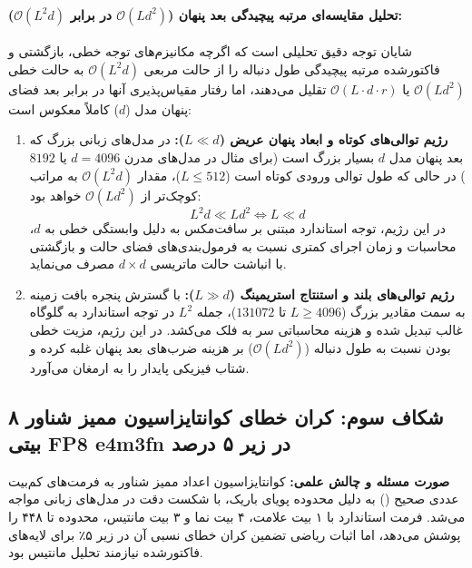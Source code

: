 \documentclass[12pt,a4paper]{report}
\theoremstyle{definition}
\begin{document}
\paragraph{تحلیل مقایسه‌ای مرتبه پیچیدگی بعد پنهان ($\mathcal{O}(L d^2)$ در برابر $\mathcal{O}(L^2 d)$):}
شایان توجه دقیق تحلیلی است که اگرچه مکانیزم‌های توجه خطی، بازگشتی و فاکتورشده مرتبه پیچیدگی طول دنباله را از حالت مربعی $\mathcal{O}(L^2 d)$ به حالت خطی $\mathcal{O}(L d^2)$ یا $\mathcal{O}(L \cdot d \cdot r)$ تقلیل می‌دهند، اما رفتار مقیاس‌پذیری آنها در برابر بعد فضای پنهان مدل ($d$) کاملاً معکوس است:
\begin{enumerate}
    \item \textbf{رژیم توالی‌های کوتاه و ابعاد پنهان عریض ($L \ll d$):} در مدل‌های زبانی بزرگ که بعد پنهان مدل $d$ بسیار بزرگ است (برای مثال در مدل‌های مدرن $d = 4096$ یا $8192$) در حالی که طول توالی ورودی کوتاه است ($L \le 512$)، مقدار $\mathcal{O}(L^2 d)$ به مراتب کوچک‌تر از $\mathcal{O}(L d^2)$ خواهد بود:
    \begin{equation}
        L^2 d \ll L d^2 \iff L \ll d
    \end{equation}
    در این رژیم، توجه استاندارد مبتنی بر سافت‌مکس به دلیل وابستگی خطی به $d$، محاسبات و زمان اجرای کمتری نسبت به فرمول‌بندی‌های فضای حالت و بازگشتی با انباشت حالت ماتریسی $d \times d$ مصرف می‌نماید.
    \item \textbf{رژیم توالی‌های بلند و استنتاج استریمینگ ($L \gg d$):} با گسترش پنجره بافت زمینه به سمت مقادیر بزرگ ($L \ge 4096$ تا $131072$)، جمله $L^2$ در توجه استاندارد به گلوگاه غالب تبدیل شده و هزینه محاسباتی سر به فلک می‌کشد. در این رژیم، مزیت خطی بودن نسبت به طول دنباله ($\mathcal{O}(L d^2)$) بر هزینه ضرب‌های بعد پنهان غلبه کرده و شتاب فیزیکی پایدار را به ارمغان می‌آورد.
\end{enumerate}

\subsection{شکاف سوم: کران خطای کوانتایزاسیون ممیز شناور ۸ بیتی FP8 e4m3fn در زیر ۵ درصد}
\label{subsec:gap3_fp8_bounding}
\textbf{صورت مسئله و چالش علمی:} کوانتایزاسیون اعداد ممیز شناور به فرمت‌های کم‌بیت عددی صحیح () به دلیل محدوده پویای باریک، با شکست دقت در مدل‌های زبانی مواجه می‌شد. فرمت استاندارد  با ۱ بیت علامت، ۴ بیت نما و ۳ بیت مانتیس، محدوده تا ۴۴۸ را پوشش می‌دهد، اما اثبات ریاضی تضمین کران خطای نسبی آن در زیر ۵٪ برای لایه‌های فاکتورشده نیازمند تحلیل مانتیس بود.
\end{document}
